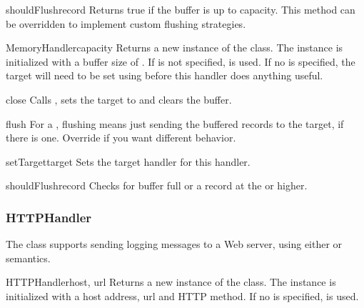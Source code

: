 \begin{methoddesc}{shouldFlush}{record}
Returns true if the buffer is up to capacity. This method can be
overridden to implement custom flushing strategies.
\end{methoddesc}

\begin{classdesc}{MemoryHandler}{capacity}
Returns a new instance of the  class. The
instance is initialized with a buffer size of . If
 is not specified,  is used. If no
 is specified, the target will need to be set using
 before this handler does anything useful.
\end{classdesc}

\begin{methoddesc}{close}{}
Calls , sets the target to  and
clears the buffer.
\end{methoddesc}

\begin{methoddesc}{flush}{}
For a , flushing means just sending the buffered
records to the target, if there is one. Override if you want
different behavior.
\end{methoddesc}

\begin{methoddesc}{setTarget}{target}
Sets the target handler for this handler.
\end{methoddesc}

\begin{methoddesc}{shouldFlush}{record}
Checks for buffer full or a record at the  or higher.
\end{methoddesc}

\subsubsection{HTTPHandler}

The  class supports sending logging messages to a
Web server, using either  or  semantics.

\begin{classdesc}{HTTPHandler}{host, url}
Returns a new instance of the  class. The
instance is initialized with a host address, url and HTTP method.
If no  is specified,  is used.
\end{classdesc}

